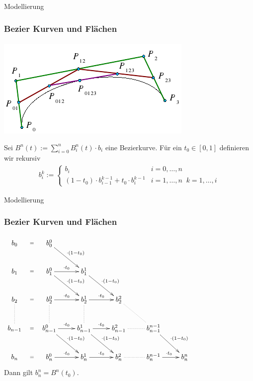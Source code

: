 \documentclass{beamer}
\begin{document}
\begin{frame}{Modellierung}
\frametitle{Bezier Kurven und Flächen}
\framesubtitle{}

  \includegraphics{images/decasteljau}

Sei $B^n(t) := \sum_{i = 0}^{n} B_i^n(t) \cdot  b_i$ eine Bezierkurve. Für ein 
$t_0 \in [0,1]$ definieren wir rekursiv  
\begin{align*}
b_i^k := \begin{cases}
b_i   & i= 0, \hdots,  n \\
(1-t_0) \cdot b_{i-1}^{k-1} + t_0 \cdot b_{i}^{k-1} &  i = 1, \hdots , n \; \;   k = 1, \hdots , i 
\end{cases} 
\end{align*}
\end{frame}


\begin{frame}{Modellierung}
\frametitle{Bezier Kurven und Flächen}
\framesubtitle{}


\begin{align*}
\xymatrix{
b_0   \ar@{}[r]|-{=}  &  b_0^0 \ar[dr]^{\cdot(1-t_0)}  &  & & & & & &  \\
b_1   \ar@{}[r]|-{=}  &  b_1^0  \ar[r]^{\cdot t_0} \ar[dr]^{\cdot(1-t_0)} &   b_1^1  \ar[dr]^{\cdot(1-t_0)} & & & & & & \\
b_2   \ar@{}[r]|-{=}  \ar@{..}[d] &  b_2^0  \ar[r]^{\cdot t_0}  \ar@{..}[d] &   b_2^1 \ar[r]^{\cdot t_0}  \ar@{..}[d] &  b_2^2   \ar@{..}[dr]& & & & & \\
b_{n-1}   \ar@{}[r]|-{=}  &  b_{n-1}^0   \ar[r]^{\cdot t_0}  \ar[dr]^{\cdot(1-t_0)} &    b_{n-1}^1   \ar[r]^{\cdot t_0}  \ar[dr]^{\cdot(1-t_0)} &  b_{n-1}^2  \ar@{..}[r] &  
b_{n-1}^{n-1}  \ar[dr]^{\cdot(1-t_0)} & & & & \\
b_{n}   \ar@{}[r]|-{=}  &  b_{n}^0  \ar[r]^{\cdot t_0}  &    b_{n}^1   \ar[r]^{\cdot t_0}  &  b_{n}^2  \ar@{..}[r] & b_{n}^{n-1}   \ar[r]^{\cdot t_0}& b_{n}^{n}& & & 
}
\end{align*}
Dann gilt $b_n^n = B^n(t_0)$.

\end{frame}
\end{document}
